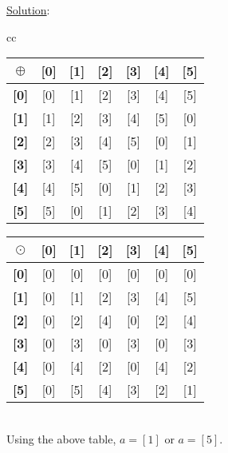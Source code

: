 \documentclass{article} %
\begin{document}
\underline{Solution}: 
\begin{addmargin}[1em]{0em}
\begin{tabular}{cc}
\begin{tabular}{|c|c|c|c|c|c|c|}
\hline
\textbf{$\oplus$}&\textbf{[0]}&\textbf{[1]}&\textbf{[2]}&\textbf{[3]}&\textbf{[4]}&\textbf{[5]}\\ \hline
\textbf{[0]} & [0] & [1] & [2] & [3] & [4] & [5]\\ \hline
\textbf{[1]} & [1] & [2] & [3] & [4] & [5] & [0]\\ \hline
\textbf{[2]} & [2] & [3] & [4] & [5] & [0] & [1]\\ \hline
\textbf{[3]} & [3] & [4] & [5] & [0] & [1] & [2]\\ \hline
\textbf{[4]} & [4] & [5] & [0] & [1] & [2] & [3]\\ \hline
\textbf{[5]} & [5] & [0] & [1] & [2] & [3] & [4]\\ \hline
\end{tabular}

\quad

\begin{tabular}{|c|c|c|c|c|c|c|}
\hline
\textbf{$\odot$}&\textbf{[0]}&\textbf{[1]}&\textbf{[2]}&\textbf{[3]}&\textbf{[4]}&\textbf{[5]}\\ \hline
\textbf{[0]} & [0] & [0] & [0] & [0] & [0] & [0]\\ \hline
\textbf{[1]} & [0] & [1] & [2] & [3] & [4] & [5]\\ \hline
\textbf{[2]} & [0] & [2] & [4] & [0] & [2] & [4]\\ \hline
\textbf{[3]} & [0] & [3] & [0] & [3] & [0] & [3]\\ \hline
\textbf{[4]} & [0] & [4] & [2] & [0] & [4] & [2]\\ \hline
\textbf{[5]} & [0] & [5] & [4] & [3] & [2] & [1]\\ \hline
\end{tabular}
\end{tabular}
\\ \break Using the above table, $a = [1]$ or $a = [5]$.
\end{addmargin}

\end{document}
